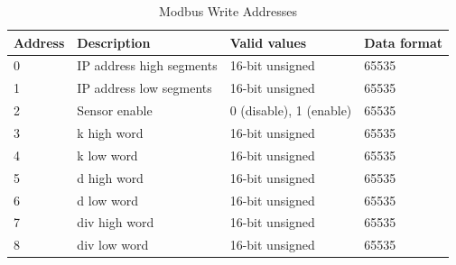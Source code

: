 \begin{table}[ht]
    \centering
    \begin{tabular}{|l|l|l|l|}
    \hline \textbf{Address} & \textbf{Description} & \textbf{Valid values} & \textbf{Data format} \\ 
    \hline
    \hline 0 & IP address high segments & 16-bit unsigned & 65535 \\ 
    \hline 1 & IP address low segments & 16-bit unsigned & 65535 \\ 
    \hline 2 & Sensor enable & 0 (disable), 1 (enable) & 65535 \\ 
    \hline 3 & k high word & 16-bit unsigned & 65535 \\ 
    \hline 4 & k low word & 16-bit unsigned & 65535 \\ 
    \hline 5 & d high word & 16-bit unsigned & 65535 \\ 
    \hline 6 & d low word & 16-bit unsigned & 65535 \\ 
    \hline 7 & div high word & 16-bit unsigned & 65535 \\ 
    \hline 8 & div low word & 16-bit unsigned & 65535 \\ 
    \hline 
    \end{tabular}
    \caption{Modbus Write Addresses}
\end{table}

